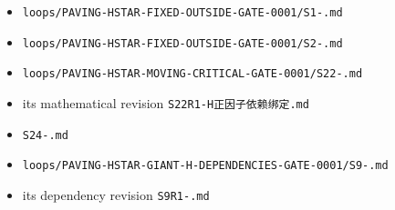 \documentclass[10pt]{article}
\begin{document}
\begin{itemize}
\item \texttt{loops/\allowbreak{}PAVING-\allowbreak{}HSTAR-\allowbreak{}FIXED-\allowbreak{}OUTSIDE-\allowbreak{}GATE-\allowbreak{}0001/\allowbreak{}S1-.\allowbreak{}md}
\item \texttt{loops/\allowbreak{}PAVING-\allowbreak{}HSTAR-\allowbreak{}FIXED-\allowbreak{}OUTSIDE-\allowbreak{}GATE-\allowbreak{}0001/\allowbreak{}S2-.\allowbreak{}md}
\item \texttt{loops/\allowbreak{}PAVING-\allowbreak{}HSTAR-\allowbreak{}MOVING-\allowbreak{}CRITICAL-\allowbreak{}GATE-\allowbreak{}0001/\allowbreak{}S22-.\allowbreak{}md}
\item its mathematical revision \texttt{S22R1-H{\cjkfont 正\allowbreak{}因\allowbreak{}子\allowbreak{}依\allowbreak{}赖\allowbreak{}绑\allowbreak{}定}.\allowbreak{}md}
\item \texttt{S24-.\allowbreak{}md}
\item \texttt{loops/\allowbreak{}PAVING-\allowbreak{}HSTAR-\allowbreak{}GIANT-\allowbreak{}H-\allowbreak{}DEPENDENCIES-\allowbreak{}GATE-\allowbreak{}0001/\allowbreak{}S9-.\allowbreak{}md}
\item its dependency revision \texttt{S9R1-.\allowbreak{}md}

\end{itemize}
\end{document}
